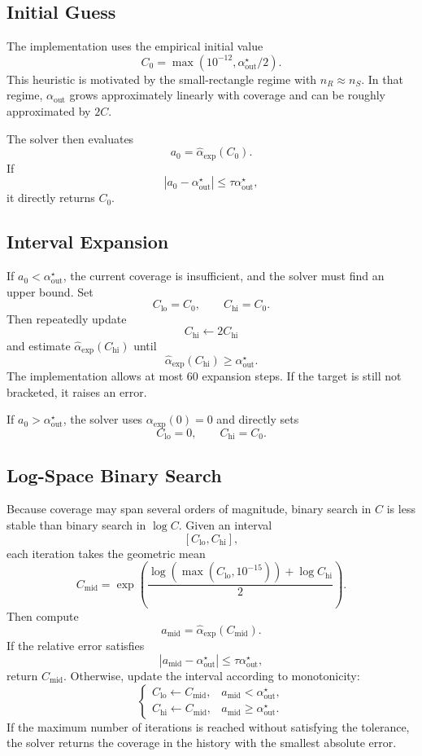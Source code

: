 \documentclass[11pt,a4paper]{article}
\begin{document}
\subsection{Initial Guess}

The implementation uses the empirical initial value
\[
  C_0=\max(10^{-12},\alpha_{\mathrm{out}}^\star/2).
\]
This heuristic is motivated by the small-rectangle regime with $n_R\approx n_S$. In that regime, $\alpha_{\mathrm{out}}$ grows approximately linearly with coverage and can be roughly approximated by $2C$.

The solver then evaluates
\[
  a_0=\widehat\alpha_{\mathrm{exp}}(C_0).
\]
If
\[
  |a_0-\alpha_{\mathrm{out}}^\star|
  \le
  \tau\alpha_{\mathrm{out}}^\star,
\]
it directly returns $C_0$.

\subsection{Interval Expansion}

If $a_0<\alpha_{\mathrm{out}}^\star$, the current coverage is insufficient, and the solver must find an upper bound. Set
\[
  C_{\mathrm{lo}}=C_0,
  \qquad
  C_{\mathrm{hi}}=C_0.
\]
Then repeatedly update
\[
  C_{\mathrm{hi}}\leftarrow2C_{\mathrm{hi}}
\]
and estimate $\widehat\alpha_{\mathrm{exp}}(C_{\mathrm{hi}})$ until
\[
  \widehat\alpha_{\mathrm{exp}}(C_{\mathrm{hi}})
  \ge
  \alpha_{\mathrm{out}}^\star.
\]
The implementation allows at most 60 expansion steps. If the target is still not bracketed, it raises an error.

If $a_0>\alpha_{\mathrm{out}}^\star$, the solver uses $\alpha_{\mathrm{exp}}(0)=0$ and directly sets
\[
  C_{\mathrm{lo}}=0,
  \qquad
  C_{\mathrm{hi}}=C_0.
\]

\subsection{Log-Space Binary Search}

Because coverage may span several orders of magnitude, binary search in $C$ is less stable than binary search in $\log C$. Given an interval
\[
  [C_{\mathrm{lo}},C_{\mathrm{hi}}],
\]
each iteration takes the geometric mean
\[
  C_{\mathrm{mid}}
  =
  \exp\left(
    \frac{
      \log(\max(C_{\mathrm{lo}},10^{-15}))
      +
      \log C_{\mathrm{hi}}
    }{2}
  \right).
\]
Then compute
\[
  a_{\mathrm{mid}}
  =
  \widehat\alpha_{\mathrm{exp}}(C_{\mathrm{mid}}).
\]
If the relative error satisfies
\[
  |a_{\mathrm{mid}}-\alpha_{\mathrm{out}}^\star|
  \le
  \tau\alpha_{\mathrm{out}}^\star,
\]
return $C_{\mathrm{mid}}$. Otherwise, update the interval according to monotonicity:
\[
\begin{cases}
C_{\mathrm{lo}}\leftarrow C_{\mathrm{mid}},&a_{\mathrm{mid}}<\alpha_{\mathrm{out}}^\star,\\
C_{\mathrm{hi}}\leftarrow C_{\mathrm{mid}},&a_{\mathrm{mid}}\ge\alpha_{\mathrm{out}}^\star.
\end{cases}
\]
If the maximum number of iterations is reached without satisfying the tolerance, the solver returns the coverage in the history with the smallest absolute error.
\end{document}
